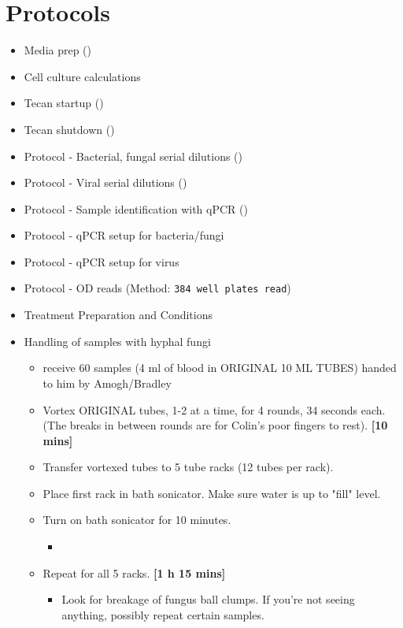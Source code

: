 \documentclass{article}
\newcounter{comments}
\newcommand{\bradley}[1]{{\addtocounter{comments}{1}}{\color{violet}{[\textbf{TODO Bradley \thecomments :}\ #1]}}}
\newcommand{\colin}[1]{{\addtocounter{comments}{1}}{\color{cyan}{[\textbf{TODO Colin \thecomments :}\ #1]}}}
\begin{document}
\section{Protocols}
\begin{itemize}
    \item Media prep ()
    \item Cell culture calculations
    \item Tecan startup ()
    \item Tecan shutdown ()
    \item Protocol - Bacterial, fungal serial dilutions ()
    \item Protocol - Viral serial dilutions ()
    \item Protocol - Sample identification with qPCR  ()
    \item Protocol - qPCR setup for bacteria/fungi 
    \item Protocol - qPCR setup for virus 
    \item Protocol - OD reads (Method: \texttt{384 well plates read})
    \item Treatment Preparation and Conditions \bradley{}
    \item Handling of samples with hyphal fungi \colin{} 
    \begin{itemize}
        \item receive 60 samples (4 ml of blood in ORIGINAL 10 ML TUBES) handed to him by Amogh/Bradley
        \item Vortex ORIGINAL tubes, 1-2 at a time, for 4 rounds, 34 seconds each. (The breaks in between rounds are for Colin's poor fingers to rest). \textbf{[10 mins]}
        \item Transfer vortexed tubes to 5 tube racks (12 tubes per rack).
        \item Place first rack in bath sonicator. Make sure water is up to "fill" level.
        \item Turn on bath sonicator for 10 minutes. 
        \begin{itemize}
            \item 
        \end{itemize}
        \item Repeat for all 5 racks. \textbf{[1 h 15 mins]}
        \begin{itemize}
            \item Look for breakage of fungus ball clumps. If you're not seeing anything, possibly repeat certain samples.

\end{itemize}
\end{itemize}
\end{itemize}
\end{document}
